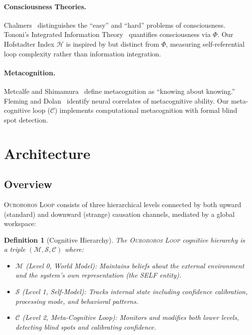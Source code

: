 \documentclass[11pt,a4paper]{article}
\newtheorem{definition}{Definition}[section]
\newcommand{\OL}{\textsc{Ouroboros Loop}}
\newcommand{\HI}{\mathcal{H}}  %
\newcommand{\SM}{\mathcal{S}}  %
\newcommand{\WM}{\mathcal{M}}  %
\newcommand{\MC}{\mathcal{C}}  %
\begin{document}
\paragraph{Consciousness Theories.}
Chalmers~\citep{chalmers1995facing, chalmers1996conscious} distinguishes
the ``easy'' and ``hard'' problems of consciousness. Tononi's Integrated
Information Theory~\citep{tononi2004iit} quantifies consciousness via
$\Phi$. Our Hofstadter Index $\HI$ is inspired by but distinct from
$\Phi$, measuring self-referential loop complexity rather than
information integration.

\paragraph{Metacognition.}
Metcalfe and Shimamura~\citep{metcalfe1994metacognition} define
metacognition as ``knowing about knowing.'' Fleming and
Dolan~\citep{fleming2012metacognition} identify neural correlates of
metacognitive ability. Our meta-cognitive loop ($\MC$) implements
computational metacognition with formal blind spot detection.

\section{Architecture}
\label{sec:architecture}

\subsection{Overview}

\OL{} consists of three hierarchical levels connected by both upward
(standard) and downward (strange) causation channels, mediated by a
global workspace:

\begin{definition}[Cognitive Hierarchy]
\label{def:hierarchy}
The \OL{} cognitive hierarchy is a triple $(\WM, \SM, \MC)$ where:
\begin{itemize}
  \item $\WM$ (Level 0, World Model): Maintains beliefs about the
        external environment and the system's own representation
        (the SELF entity).
  \item $\SM$ (Level 1, Self-Model): Tracks internal state including
        confidence calibration, processing mode, and behavioral patterns.
  \item $\MC$ (Level 2, Meta-Cognitive Loop): Monitors and modifies
        both lower levels, detecting blind spots and calibrating confidence.
\end{itemize}
\end{definition}
\end{document}
